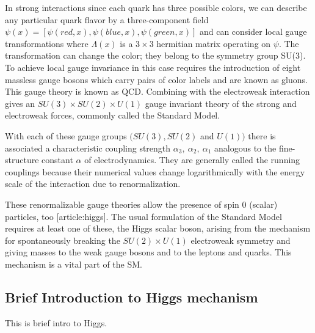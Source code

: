
In strong interactions since each quark has three possible colors, we can describe any particular quark flavor by a three-component field $\psi(x)=[\psi(red,x),\psi(blue,x),\psi(green,x)]$ and can consider local gauge transformations where $\Lambda(x)$ is a $3\times 3$ hermitian matrix operating on $\psi$. The transformation can change the color; they belong to the symmetry group SU(3). To achieve local gauge invariance in this case requires the introduction of eight massless gauge bosons which carry pairs of color labels and are known as gluons. This gauge theory is known as QCD. Combining with the electroweak interaction gives an $SU(3)\times SU(2) \times U(1)$ gauge invariant theory of the strong and electroweak forces, commonly called the Standard Model.

With each of these gauge groups $(SU(3),SU(2)$ and $U(1))$ there is associated a characteristic coupling strength $\alpha_3,~\alpha_2,~\alpha_1$ analogous to the fine-structure constant $\alpha$ of electrodynamics. They are generally called the running couplings because their numerical values change logarithmically with the energy scale of the interaction due to renormalization.

These renormalizable gauge theories allow the presence of spin 0 (scalar) particles, too [article:higgs]. The usual formulation of the Standard Model requires at least one of these, the Higgs scalar boson, arising from the mechanism for spontaneously breaking the $SU(2)\times U(1)$ electroweak symmetry and giving masses to the weak gauge bosons and to the leptons and quarks. This mechanism is a vital part of the SM.


\subsection{Brief Introduction to Higgs mechanism}
This is brief intro to Higgs.


